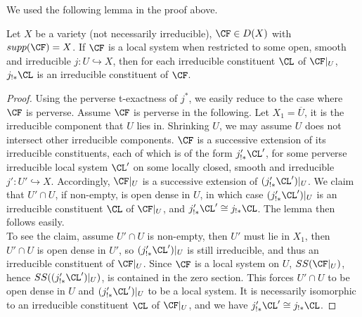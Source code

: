 We used the following lemma in the proof above.

\begin{lemma}\label{lem_perv_1}
    Let $X$ be a variety (not necessarily irreducible), $\CF\in D(X)$ with $supp(\CF)=X$. If $\CF$ is a local system when restricted to some open, smooth and irreducible $j: U\hookrightarrow X$, then for each irreducible constituent $\CL$ of $\CF|_U$, $j_{!*}\CL$ is an irreducible constituent of $\CF$.
\end{lemma}

\begin{proof}
    Using the perverse t-exactness of $j^*$, we easily reduce to the case where $\CF$ is perverse. Assume $\CF$ is perverse in the following. Let $X_1=\overline{U}$, it is the irreducible component that $U$ lies in. Shrinking $U$, we may assume $U$ does not intersect other irreducible components. $\CF$ is a successive extension of its irreducible constituents, each of which is of the form $j'_{!*}\CL'$, for some perverse irreducible local system $\CL'$ on some locally closed, smooth and irreducible $j': U'\hookrightarrow X$. Accordingly, $\CF|_U$ is a successive extension of $(j'_{!*}\CL')|_U$. We claim that $U'\cap U$, if non-empty, is open dense in $U$, in which case $(j'_{!*}\CL')|_U$ is an irreducible constituent $\CL$ of $\CF|_U$, and $j'_{!*}\CL'\cong j_{!*}\CL$. The lemma then follows easily.\\

    To see the claim, assume $U'\cap U$ is non-empty, then $U'$ must lie in $X_1$, then $U'\cap U$ is open dense in $U'$, so $(j'_{!*}\CL')|_U$ is still irreducible, and thus an irreducible constituent of $\CF|_U$. Since $\CF$ is a local system on $U$, $SS(\CF|_{U})$, hence $SS((j'_{!*}\CL')|_U)$, is contained in the zero section. This forces $U'\cap U$ to be open dense in $U$ and $(j'_{!*}\CL')|_U$ to be a local system. It is necessarily isomorphic to an irreducible constituent $\CL$ of $\CF|_U$, and we have $j'_{!*}\CL'\cong j_{!*}\CL$.

\end{proof}


\printbibliography

\Addresses

